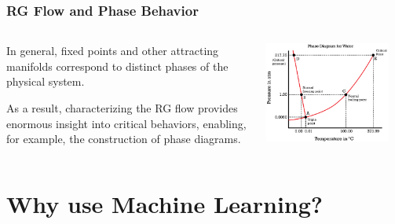 \documentclass[aspectratio=169, 12pt]{beamer}
\begin{document}
\begin{frame}

    \frametitle{RG Flow and Phase Behavior}

    \begin{columns}
    \begin{column}{.6\textwidth}
    
        In general, fixed points and other attracting manifolds correspond to distinct phases of the physical system. 

        \vspace{1em}

        As a result, characterizing the RG flow provides enormous insight into critical behaviors, enabling, for example, the construction of phase diagrams. 
        
    \end{column}
    \begin{column}{.4\textwidth}
        \includegraphics[width=0.9\textwidth]{images/water-phase.png}
    \end{column}
    \end{columns}

\end{frame}

\section{Why use Machine Learning?}
\end{document}
